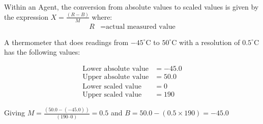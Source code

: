 Within an Agent, the conversion from absolute values to scaled values is given by the expression $X = \frac{(R - B)}{M}$ where:
\begin{align*}
    R &= \text{actual measured value}
\end{align*}

A thermometer that does readings from $-45^\circ$C  to $50^\circ$C with a resolution of $0.5^\circ$C has the following values:

\begin{align*}
    \text{Lower absolute value} &= -45.0 \\
    \text{Upper absolute value} &= 50.0 \\
    \text{Lower scaled value} &= 0 \\
    \text{Upper scaled value} &= 190
\end{align*}

Giving $M = \frac{(50.0 - (-45.0))}{(190 – 0)} = 0.5$ and $B = 50.0 - (0.5 \times 190) = -45.0$
